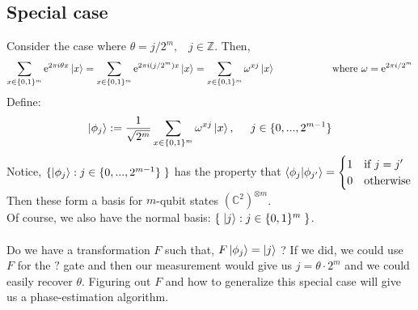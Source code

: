\documentclass[11pt]{article}
\begin{document}
\subsection{Special case}
Consider the case where $\theta = j/2^m, \;\;\; j \in
\mathbb{Z}$. Then,
\[ \sum_{x \in \{0,1\}^m} \mathrm{e}^{2 \pi i \theta x}\ket{x} = \sum_{x \in \{0,1\}^m} \mathrm{e}^{2 \pi i (j/2^m) x}\ket{x} = \sum_{x \in \{0,1\}^m} \omega^{xj} \ket{x} \hspace{20mm} \text{where   } \omega = \mathrm{e}^{2 \pi i/2^m}\]
Define: 
\[ \ket{\phi_j} := \frac{1}{\sqrt{2^m}} \sum_{x \in \{0,1\}^m} \omega^{xj} \ket{x}, \;\;\;\;\; j \in \{0,...,2^{m-1}\} \]
Notice, $\{\ket{\phi_j} : j \in \{0,...,2^{m-1}\} \;\}$ has the property that $\ip{\phi_j}{\phi_{j'}} =  \begin{cases}
 1 & \text{if } j=j' \\
0 & \text{otherwise}
\end{cases}$\\
Then these form a basis for $m$-qubit states
$(\mathbb{C}^{2})^{\otimes m}$.\\
Of course, we also have the normal basis: $\{\; \ket{j}:  j \in \{0,1\}^m \;\}$. \\\\
Do we have a transformation $F$ such that, $F \ket{\phi_j} = \ket{j}$
? If we did, we could use $F$ for the $?$ gate and then our
measurement would give us $j = \theta \cdot 2^m$ and we could easily
recover $\theta$.  Figuring out $F$ and how to generalize this special
case will give us a phase-estimation algorithm.
\end{document}
